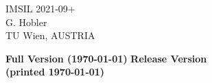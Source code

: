 %
\begin{center}
{
\vspace*{4cm}
%
\titlefont
IMSIL 2021-09+ \\ \vspace*{3cm}
%
\authorfont
G. Hobler \\ \vspace*{1ex}
}
\vspace*{2.5cm}
%
TU Wien, AUSTRIA \\ \vspace*{1ex}

%
\ifprivate
   {\bf Full Version (\today)}
\else
   {\bf Release Version \\ (printed \today)}
\fi
%
\end{center}
